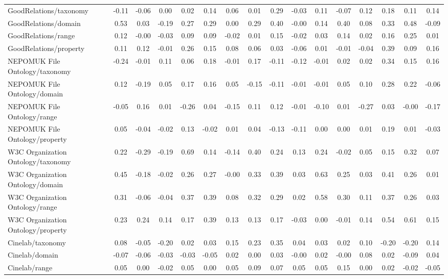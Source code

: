 \begin{tabular}{lccccccccccccccc}
GoodRelations/taxonomy & -0.11 & -0.06 & 0.00 & 0.02 & 0.14 & 0.06 & 0.01 & 0.29 & -0.03 & 0.11 & -0.07 & 0.12 & 0.18 & 0.11 & 0.14 \\
GoodRelations/domain & 0.53 & 0.03 & -0.19 & 0.27 & 0.29 & 0.00 & 0.29 & 0.40 & -0.00 & 0.14 & 0.40 & 0.08 & 0.33 & 0.48 & -0.09 \\
GoodRelations/range & 0.12 & -0.00 & -0.03 & 0.09 & 0.09 & -0.02 & 0.01 & 0.15 & -0.02 & 0.03 & 0.14 & 0.02 & 0.16 & 0.25 & 0.01 \\
GoodRelations/property & 0.11 & 0.12 & -0.01 & 0.26 & 0.15 & 0.08 & 0.06 & 0.03 & -0.06 & 0.01 & -0.01 & -0.04 & 0.39 & 0.09 & 0.16 \\
NEPOMUK File Ontology/taxonomy & -0.24 & -0.01 & 0.11 & 0.06 & 0.18 & -0.01 & 0.17 & -0.11 & -0.12 & -0.01 & 0.02 & 0.02 & 0.34 & 0.15 & 0.16 \\
NEPOMUK File Ontology/domain & 0.12 & -0.19 & 0.05 & 0.17 & 0.16 & 0.05 & -0.15 & -0.11 & -0.01 & -0.01 & 0.05 & 0.10 & 0.28 & 0.22 & -0.06 \\
NEPOMUK File Ontology/range & -0.05 & 0.16 & 0.01 & -0.26 & 0.04 & -0.15 & 0.11 & 0.12 & -0.01 & -0.10 & 0.01 & -0.27 & 0.03 & -0.00 & -0.17 \\
NEPOMUK File Ontology/property & 0.05 & -0.04 & -0.02 & 0.13 & -0.02 & 0.01 & 0.04 & -0.13 & -0.11 & 0.00 & 0.00 & 0.01 & 0.19 & 0.01 & -0.03 \\
W3C Organization Ontology/taxonomy & 0.22 & -0.29 & -0.19 & 0.69 & 0.14 & -0.14 & 0.40 & 0.24 & 0.13 & 0.24 & -0.02 & 0.05 & 0.15 & 0.32 & 0.07 \\
W3C Organization Ontology/domain & 0.45 & -0.18 & -0.02 & 0.26 & 0.27 & -0.00 & 0.33 & 0.39 & 0.03 & 0.63 & 0.25 & 0.03 & 0.41 & 0.26 & 0.01 \\
W3C Organization Ontology/range & 0.31 & -0.06 & -0.04 & 0.37 & 0.39 & 0.08 & 0.32 & 0.29 & 0.02 & 0.58 & 0.30 & 0.11 & 0.37 & 0.26 & 0.03 \\
W3C Organization Ontology/property & 0.23 & 0.24 & 0.14 & 0.17 & 0.39 & 0.13 & 0.13 & 0.17 & -0.03 & 0.00 & -0.01 & 0.14 & 0.54 & 0.61 & 0.15 \\
Cinelab/taxonomy & 0.08 & -0.05 & -0.20 & 0.02 & 0.03 & 0.15 & 0.23 & 0.35 & 0.04 & 0.03 & 0.02 & 0.10 & -0.20 & -0.20 & 0.14 \\
Cinelab/domain & -0.07 & -0.06 & -0.03 & -0.03 & -0.05 & 0.02 & 0.00 & 0.03 & -0.00 & 0.02 & -0.00 & 0.08 & 0.02 & -0.09 & 0.04 \\
Cinelab/range & 0.05 & 0.00 & -0.02 & 0.05 & 0.00 & 0.05 & 0.09 & 0.07 & 0.05 & 0.05 & 0.15 & 0.00 & 0.02 & -0.02 & -0.05 \\

\end{tabular}
